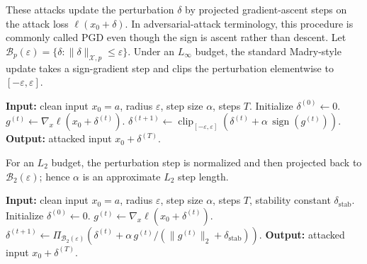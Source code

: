 \clearpage
{}
\vspace{0.4em}

\raggedbottom

These attacks update the perturbation $\delta$ by projected gradient-ascent
steps on the attack loss $\ell(x_0+\delta)$. In adversarial-attack terminology,
this procedure is commonly called PGD even though the sign is ascent rather
than descent. Let
$\mathcal B_p(\varepsilon)=\{\delta:\|\delta\|_{\mathcal X,p}\le\varepsilon\}$.
Under an $L_\infty$ budget, the standard Madry-style update
\citep{madry2018towards} takes a sign-gradient step and clips the perturbation
elementwise to $[-\varepsilon,\varepsilon]$.

\begin{algorithm}[H]
\caption{PGD attack in an $L_\infty$ ball}
\begin{algorithmic}[1]
\STATE \textbf{Input:} clean input $x_0=a$, radius $\varepsilon$, step size
\(\alpha\), steps \(T\).
\STATE Initialize $\delta^{(0)}\leftarrow0$.
  \STATE $g^{(t)}\leftarrow\nabla_x \ell(x_0+\delta^{(t)})$.
  \STATE $\delta^{(t+1)}\leftarrow
  \operatorname{clip}_{[-\varepsilon,\varepsilon]}
  \!\left(\delta^{(t)}+\alpha\,\operatorname{sign}(g^{(t)})\right)$.
\ENDFOR
\STATE \textbf{Output:} attacked input $x_0+\delta^{(T)}$.
\end{algorithmic}
\end{algorithm}

For an $L_2$ budget, the perturbation step is normalized and then projected
back to $\mathcal B_2(\varepsilon)$; hence $\alpha$ is an approximate $L_2$
step length.

\begin{algorithm}[H]
\caption{PGD attack in an $L_2$ ball}
\begin{algorithmic}[1]
\STATE \textbf{Input:} clean input $x_0=a$, radius $\varepsilon$, step size
$\alpha$, steps $T$, stability constant $\delta_{\mathrm{stab}}$.
\STATE Initialize $\delta^{(0)}\leftarrow0$.
  \STATE $g^{(t)}\leftarrow\nabla_x \ell(x_0+\delta^{(t)})$.
  \STATE $\delta^{(t+1)}\leftarrow
  \Pi_{\mathcal B_2(\varepsilon)}
  \!\left(\delta^{(t)}+
  \alpha\,g^{(t)}/(\|g^{(t)}\|_2+\delta_{\mathrm{stab}})\right)$.
\ENDFOR
\STATE \textbf{Output:} attacked input $x_0+\delta^{(T)}$.
\end{algorithmic}
\end{algorithm}

